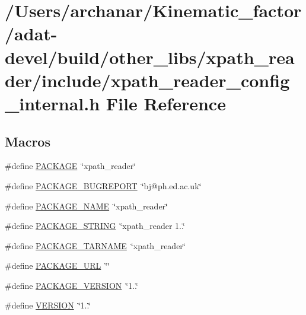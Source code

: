 \hypertarget{adat-devel_2build_2other__libs_2xpath__reader_2include_2xpath__reader__config__internal_8h}{}\section{/\+Users/archanar/\+Kinematic\+\_\+factor/adat-\/devel/build/other\+\_\+libs/xpath\+\_\+reader/include/xpath\+\_\+reader\+\_\+config\+\_\+internal.h File Reference}
\label{adat-devel_2build_2other__libs_2xpath__reader_2include_2xpath__reader__config__internal_8h}
\subsection*{Macros}
\begin{DoxyCompactItemize}
\item 
\#define \mbox{\hyperlink{adat-devel_2build_2other__libs_2xpath__reader_2include_2xpath__reader__config__internal_8h_aca8570fb706c81df371b7f9bc454ae03}{P\+A\+C\+K\+A\+GE}}~\char`\"{}xpath\+\_\+reader\char`\"{}
\item 
\#define \mbox{\hyperlink{adat-devel_2build_2other__libs_2xpath__reader_2include_2xpath__reader__config__internal_8h_a1d1d2d7f8d2f95b376954d649ab03233}{P\+A\+C\+K\+A\+G\+E\+\_\+\+B\+U\+G\+R\+E\+P\+O\+RT}}~\char`\"{}bj@ph.\+ed.\+ac.\+uk\char`\"{}
\item 
\#define \mbox{\hyperlink{adat-devel_2build_2other__libs_2xpath__reader_2include_2xpath__reader__config__internal_8h_a1c0439e4355794c09b64274849eb0279}{P\+A\+C\+K\+A\+G\+E\+\_\+\+N\+A\+ME}}~\char`\"{}xpath\+\_\+reader\char`\"{}
\item 
\#define \mbox{\hyperlink{adat-devel_2build_2other__libs_2xpath__reader_2include_2xpath__reader__config__internal_8h_ac73e6f903c16eca7710f92e36e1c6fbf}{P\+A\+C\+K\+A\+G\+E\+\_\+\+S\+T\+R\+I\+NG}}~\char`\"{}xpath\+\_\+reader 1..\char`\"{}
\item 
\#define \mbox{\hyperlink{adat-devel_2build_2other__libs_2xpath__reader_2include_2xpath__reader__config__internal_8h_af415af6bfede0e8d5453708afe68651c}{P\+A\+C\+K\+A\+G\+E\+\_\+\+T\+A\+R\+N\+A\+ME}}~\char`\"{}xpath\+\_\+reader\char`\"{}
\item 
\#define \mbox{\hyperlink{adat-devel_2build_2other__libs_2xpath__reader_2include_2xpath__reader__config__internal_8h_a5c93853116d5a50307b6744f147840aa}{P\+A\+C\+K\+A\+G\+E\+\_\+\+U\+RL}}~\char`\"{}\char`\"{}
\item 
\#define \mbox{\hyperlink{adat-devel_2build_2other__libs_2xpath__reader_2include_2xpath__reader__config__internal_8h_aa326a05d5e30f9e9a4bb0b4469d5d0c0}{P\+A\+C\+K\+A\+G\+E\+\_\+\+V\+E\+R\+S\+I\+ON}}~\char`\"{}1..\char`\"{}
\item 
\#define \mbox{\hyperlink{adat-devel_2build_2other__libs_2xpath__reader_2include_2xpath__reader__config__internal_8h_a1c6d5de492ac61ad29aec7aa9a436bbf}{V\+E\+R\+S\+I\+ON}}~\char`\"{}1..\char`\"{}
\end{DoxyCompactItemize}


